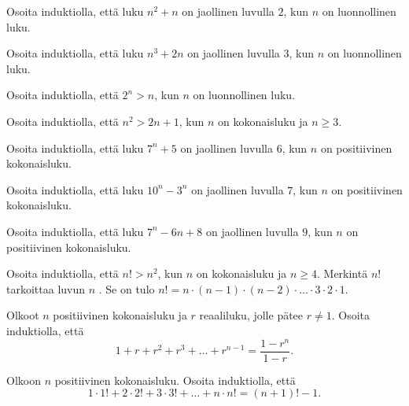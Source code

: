 \begin{tehtavasivu}

\begin{tehtava}
	Osoita induktiolla, että luku $n^2+n$ on jaollinen luvulla $2$, kun $n$ on luonnollinen luku.
\end{tehtava}

\begin{tehtava}
	Osoita induktiolla, että luku $n^3+2n$ on jaollinen luvulla $3$, kun $n$ on luonnollinen luku.
\end{tehtava}

\begin{tehtava}
	Osoita induktiolla, että $2^n > n$, kun $n$ on luonnollinen luku.
\end{tehtava}

\begin{tehtava}
	Osoita induktiolla, että $n^2 > 2n + 1$, kun $n$ on kokonaisluku ja $n \ge 3$.
\end{tehtava}

\begin{tehtava}
	Osoita induktiolla, että luku $7^n + 5$ on jaollinen luvulla $6$, kun $n$ on positiivinen kokonaisluku.
\end{tehtava}

\begin{tehtava}
	Osoita induktiolla, että luku $10^n - 3^n$ on jaollinen luvulla $7$, kun $n$ on positiivinen kokonaisluku.
\end{tehtava}

\begin{tehtava}
	Osoita induktiolla, että luku $7^n - 6n + 8$ on jaollinen luvulla $9$, kun $n$ on positiivinen kokonaisluku.
\end{tehtava}

\begin{tehtava}
	Osoita induktiolla, että $n! > n^2$, kun $n$ on kokonaisluku ja $n \ge 4$. Merkintä $n!$ tarkoittaa luvun $n$ . Se on tulo $n! = n \cdot (n-1) \cdot (n-2) \cdot \ldots \cdot 3 \cdot 2 \cdot 1$.
\end{tehtava}

\begin{tehtava}
	Olkoot $n$ positiivinen kokonaisluku ja $r$ reaaliluku, jolle pätee $r \neq 1$. Osoita induktiolla, että 
	\[
	1 + r + r^2 + r^3 + \ldots + r^{n-1} = \frac{1-r^n}{1-r}.
	\]
\end{tehtava}

\begin{tehtava}
	Olkoon $n$ positiivinen kokonaisluku. Osoita induktiolla, että 
	\[
	1 \cdot 1! + 2 \cdot 2! + 3 \cdot 3! + \ldots + n \cdot n! = (n + 1)! - 1.
	\]
\end{tehtava}


\end{tehtavasivu}
